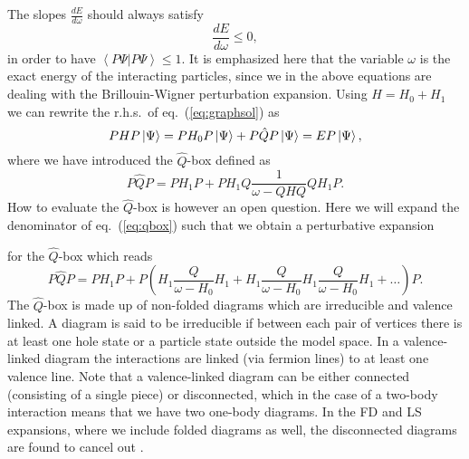 The slopes $\frac{dE}{d\omega}$
should always satisfy
\[
   \frac{dE}{d\omega}\leq 0,
\]
in order to have $\left\langle P\Psi | P\Psi\right\rangle \leq 1$.
It is emphasized here that the variable
$\omega$ is the exact energy of the interacting
particles, since we in the above equations 
are dealing with the Brillouin-Wigner perturbation
expansion. 
Using $H=H_0+H_1$ we can rewrite the r.h.s.\ of eq.\ (\ref{eq:graphsol}) 
as
\begin{equation}
    PHP\left| \Psi \right\rangle=
    PH_0P\left| \Psi \right\rangle + P\hat{Q}P\left| \Psi \right\rangle=EP\left| \Psi \right\rangle,
\end{equation}
where we have introduced the $\hat{Q}$-box defined as
\begin{equation}
     P\hat{Q}P=PH_1P+
     PH_1Q\frac{1}{\omega-QHQ}QH_1P.
    \label{eq:qbox}
\end{equation}
How to evaluate the $\hat{Q}$-box is however an open question. Here
we will expand the denominator of eq.\ (\ref{eq:qbox}) such that
we obtain a perturbative expansion

for the $\hat{Q}$-box which reads
\begin{equation}
     P\hat{Q}P=PH_1P+
     P\left(H_1 \frac{Q}{\omega-H_{0}}H_1+H_1
     \frac{Q}{\omega-H_{0}}H_1 \frac{Q}{\omega-H_{0}}H_1 +\dots\right)P.
\end{equation}
The $\hat{Q}$-box is made up of non-folded diagrams which are irreducible
and valence linked. A diagram is said to be irreducible if between each pair
of vertices there is at least one hole state or a particle state outside 
the model space. In a valence-linked diagram the interactions are linked
(via fermion lines) to at least one valence line. Note that a valence-linked
diagram can be either connected (consisting of a single piece) or
disconnected, which in the case of a two-body interaction
means that we have two one-body diagrams. In the FD and LS expansions,
where we include folded diagrams as well, the
disconnected diagrams are found to cancel out \cite{ko90}. 

